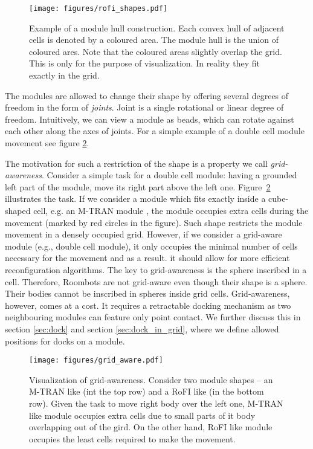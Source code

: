 \begin{figure}[!ht]
    \centering
    \texttt{[image: figures/rofi\_shapes.pdf]}
    \caption{Example of a module hull construction. Each convex hull of adjacent
    cells is denoted by a coloured area. The module hull is the union of coloured
    ares. Note that the coloured areas slightly overlap the grid. This is only
    for the purpose of visualization. In reality they fit exactly in the grid.}
    \label{fig:rofi_shapes}
\end{figure}

The modules are allowed to change their shape by offering several degrees of
freedom in the form of \emph{joints}. Joint is a single rotational or linear
degree of freedom. Intuitively, we can view a module as beads, which can rotate
against each other along the axes of joints. For a simple example of a double
cell module movement see figure \ref{fig:grid_aware}.

The motivation for such a restriction of the shape is a property we call
\emph{grid-awareness}. Consider a simple task for a double cell module: having a
grounded left part of the module, move its right part above the left one.
Figure~\ref{fig:grid_aware} illustrates the task. If we consider a module which
fits exactly inside a cube-shaped cell, e.g. an M-TRAN module
\cite{haruhisa_kurokawa_m-tran_2003}, the module occupies extra cells during the
movement (marked by red circles in the figure). Such shape restricts the module
movement in a densely occupied grid. However, if we consider a grid-aware module
(e.g., double cell module), it only occupies the minimal number of cells
necessary for the movement and as a result. it should allow for more efficient
reconfiguration algorithms. The key to grid-awareness is the sphere inscribed in
a cell. Therefore, Roombots \cite{bonardi_locomotion_2012} are not grid-aware
even though their shape is a sphere. Their bodies cannot be inscribed in spheres
inside grid cells. Grid-awareness, however, comes at a cost. It requires a
retractable docking mechanism as two neighbouring modules can feature only point
contact. We further discuss this in section \ref{sec:dock} and section
\ref{sec:dock_in_grid}, where we define allowed positions for docks on a module.

\begin{figure}[!t]
    \centering
    \texttt{[image: figures/grid\_aware.pdf]}
    \caption{Visualization of grid-awareness. Consider two module shapes -- an
    M-TRAN \cite{haruhisa_kurokawa_m-tran_2003} like (int the top row) and a
    RoFI like (in the bottom row). Given the task to move right body over the
    left one, M-TRAN like module occupies extra cells due to small parts of it
    body overlapping out of the gird. On the other hand, RoFI like module
    occupies the least cells required to make the movement. }
    \label{fig:grid_aware}
\end{figure}

